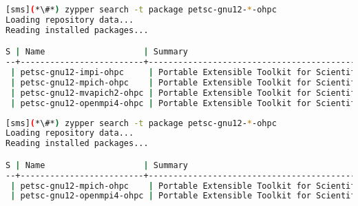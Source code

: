 \begin{lstlisting}[language=bash,keepspaces=true,keywords={}]
[sms](*\#*) zypper search -t package petsc-gnu12-*-ohpc
Loading repository data...
Reading installed packages...

S | Name                    | Summary
--+-------------------------+--------------------------------------------------------+--------
 | petsc-gnu12-impi-ohpc     | Portable Extensible Toolkit for Scientific Computation | package
 | petsc-gnu12-mpich-ohpc    | Portable Extensible Toolkit for Scientific Computation | package
 | petsc-gnu12-mvapich2-ohpc | Portable Extensible Toolkit for Scientific Computation | package
 | petsc-gnu12-openmpi4-ohpc | Portable Extensible Toolkit for Scientific Computation | package
\end{lstlisting}
\fi

\begin{lstlisting}[language=bash,keepspaces=true,keywords={}]
[sms](*\#*) zypper search -t package petsc-gnu12-*-ohpc
Loading repository data...
Reading installed packages...

S | Name                    | Summary
--+-------------------------+--------------------------------------------------------+--------
 | petsc-gnu12-mpich-ohpc    | Portable Extensible Toolkit for Scientific Computation | package
 | petsc-gnu12-openmpi4-ohpc | Portable Extensible Toolkit for Scientific Computation | package
\end{lstlisting}
\fi


